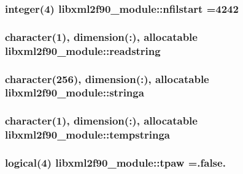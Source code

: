 \subsubsection[{nfilstart}]{\setlength{\rightskip}{0pt plus 5cm}integer(4) libxml2f90\+\_\+module\+::nfilstart =4242}\label{namespacelibxml2f90__module_a76bbe7c27297a807f15421a654d7ca6b}
\hypertarget{namespacelibxml2f90__module_a791c6344181b9375ed7fc4470f4554aa}{}
\subsubsection[{readstring}]{\setlength{\rightskip}{0pt plus 5cm}character(1), dimension(\+:), allocatable libxml2f90\+\_\+module\+::readstring}\label{namespacelibxml2f90__module_a791c6344181b9375ed7fc4470f4554aa}
\hypertarget{namespacelibxml2f90__module_ab661dc207b668f91bdee9a3efea3dd49}{}
\subsubsection[{stringa}]{\setlength{\rightskip}{0pt plus 5cm}character(256), dimension(\+:), allocatable libxml2f90\+\_\+module\+::stringa}\label{namespacelibxml2f90__module_ab661dc207b668f91bdee9a3efea3dd49}
\hypertarget{namespacelibxml2f90__module_a55e059defbab12f54d54b8f44ad84777}{}
\subsubsection[{tempstringa}]{\setlength{\rightskip}{0pt plus 5cm}character(1), dimension(\+:), allocatable libxml2f90\+\_\+module\+::tempstringa}\label{namespacelibxml2f90__module_a55e059defbab12f54d54b8f44ad84777}
\hypertarget{namespacelibxml2f90__module_aaa46bc31e8406d83b035ff8b620563a8}{}
\subsubsection[{tpaw}]{\setlength{\rightskip}{0pt plus 5cm}logical(4) libxml2f90\+\_\+module\+::tpaw =.false.}\label{namespacelibxml2f90__module_aaa46bc31e8406d83b035ff8b620563a8}
\hypertarget{namespacelibxml2f90__module_a01eddf97a14bcc393835cd086f78dfdf}{}
